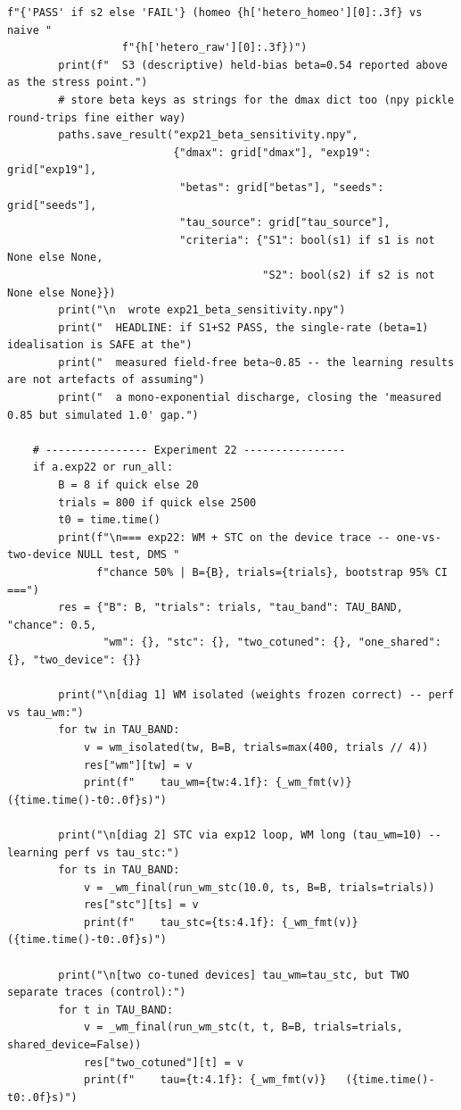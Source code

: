 \begin{lstlisting}[caption={mrl\_trace/extensions.py},label={lst:siox-src-extensions}]
                  f"{'PASS' if s2 else 'FAIL'} (homeo {h['hetero_homeo'][0]:.3f} vs naive "
                  f"{h['hetero_raw'][0]:.3f})")
        print(f"  S3 (descriptive) held-bias beta=0.54 reported above as the stress point.")
        # store beta keys as strings for the dmax dict too (npy pickle round-trips fine either way)
        paths.save_result("exp21_beta_sensitivity.npy",
                          {"dmax": grid["dmax"], "exp19": grid["exp19"],
                           "betas": grid["betas"], "seeds": grid["seeds"],
                           "tau_source": grid["tau_source"],
                           "criteria": {"S1": bool(s1) if s1 is not None else None,
                                        "S2": bool(s2) if s2 is not None else None}})
        print("\n  wrote exp21_beta_sensitivity.npy")
        print("  HEADLINE: if S1+S2 PASS, the single-rate (beta=1) idealisation is SAFE at the")
        print("  measured field-free beta~0.85 -- the learning results are not artefacts of assuming")
        print("  a mono-exponential discharge, closing the 'measured 0.85 but simulated 1.0' gap.")

    # ---------------- Experiment 22 ----------------
    if a.exp22 or run_all:
        B = 8 if quick else 20
        trials = 800 if quick else 2500
        t0 = time.time()
        print(f"\n=== exp22: WM + STC on the device trace -- one-vs-two-device NULL test, DMS "
              f"chance 50% | B={B}, trials={trials}, bootstrap 95% CI ===")
        res = {"B": B, "trials": trials, "tau_band": TAU_BAND, "chance": 0.5,
               "wm": {}, "stc": {}, "two_cotuned": {}, "one_shared": {}, "two_device": {}}

        print("\n[diag 1] WM isolated (weights frozen correct) -- perf vs tau_wm:")
        for tw in TAU_BAND:
            v = wm_isolated(tw, B=B, trials=max(400, trials // 4))
            res["wm"][tw] = v
            print(f"    tau_wm={tw:4.1f}: {_wm_fmt(v)}   ({time.time()-t0:.0f}s)")

        print("\n[diag 2] STC via exp12 loop, WM long (tau_wm=10) -- learning perf vs tau_stc:")
        for ts in TAU_BAND:
            v = _wm_final(run_wm_stc(10.0, ts, B=B, trials=trials))
            res["stc"][ts] = v
            print(f"    tau_stc={ts:4.1f}: {_wm_fmt(v)}   ({time.time()-t0:.0f}s)")

        print("\n[two co-tuned devices] tau_wm=tau_stc, but TWO separate traces (control):")
        for t in TAU_BAND:
            v = _wm_final(run_wm_stc(t, t, B=B, trials=trials, shared_device=False))
            res["two_cotuned"][t] = v
            print(f"    tau={t:4.1f}: {_wm_fmt(v)}   ({time.time()-t0:.0f}s)")


\end{lstlisting}
